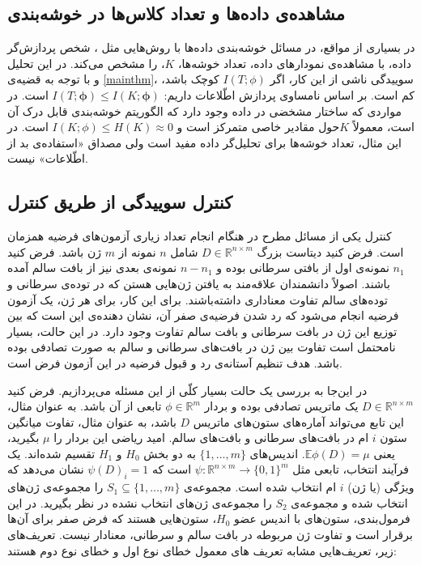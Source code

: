 \documentclass[a4paper,12pt]{article}
\newcommand{\E}{\mathbb{E}}
\newcommand{\bfphi}{\bm {\phi}}
\begin{document}
	\subsection{مشاهده‌ی داده‌‌ها و تعداد کلاس‌ها در خوشه‌بندی}
	در بسیاری از مواقع، در مسائل خوشه‌بندی داده‌ها با روش‌هایی مثل 
	،
	شخص پردازش‌گر داده، با مشاهد‌ه‌ی نمودارهای داده، تعداد خوشه‌ها،
	$K$،
	را مشخص می‌کند. در این تحلیل و با توجه به قضیه‌ی
	\eqref{mainthm}،
	سوییدگی ناشی از این کار، اگر 
	$I(T; \phi)$
	کوچک باشد، کم است. بر اساس نامساوی پردازش اطّلاعات داریم:
	$I(T; \bfphi) \leq I(K; \bfphi)$
	است. در مواردی که ساختار مشخضی در داده وجود دارد که الگوریتم خوشه‌بندی قابل درک آن است، معمولاً $K$حول مقادیر خاصی متمرکز است و 
	$I(K; \phi) \leq H(K) \approx 0$
	است. در این مثال، تعداد خوشه‌ها برای تحلیل‌گر داده مفید است ولی مصداق «استفاده‌ی بد از اطّلاعات» نیست.
	\subsection{کنترل سوییدگی از طریق کنترل
	}
	
	کنترل
	یکی از مسائل مطرح در هنگام انجام تعداد زیاری آزمون‌های فرضیه همزمان است. فرض کنید دیتاست بزرگ 
	$D \in \mathbb{R}^{n\times m}$
	شامل
	$n$
	نمونه از 
	$m$
	ژن باشد. فرض کنید 
	$n_1$
	نمونه‌ی اول از بافتی سرطانی بوده و 
	$n-n_1$
	نمونه‌ی بعدی نیز از بافت سالم آمده باشند. اصولاً دانشمندان علاقه‌مند به یافتن ژن‌هایی هستن که در توده‌ی سرطانی و توده‌های سالم تفاوت معناداری داشته‌باشند. برای این کار، برای هر ژن، یک آزمون فرضیه انجام می‌شود که رد شدن فرضیه‌ی صفر آن، نشان دهنده‌ی این است که بین توزیع این ژن در بافت سرطانی و بافت سالم تفاوت وجود دارد. در این حالت، بسیار نامحتمل است  تفاوت بین ژن در بافت‌های سرطانی و سالم به صورت تصادفی بوده باشد. هدف تنظیم آستانه‌ی رد و قبول فرضیه در این آزمون فرض است.
	
	در این‌جا به بررسی یک حالت بسیار کلّی از این مسئله می‌پردازیم. فرض کنید 
	$D \in \mathbb{R}^{n\times m}$
	یک ماتریس تصادفی بوده و بردار 
	$\phi \in \mathbb{R}^m$
	تابعی از آن باشد. به عنوان مثال، این تابع می‌تواند آماره‌های ستون‌های ماتریس 
	$D$
	باشد، به عنوان مثال، تفاوت میانگین ستون‌ 
	$i$
	ام در بافت‌های سرطانی و بافت‌های سالم.  امید ریاضی این بردار را 
	$\mu$
	بگیرید، یعنی
	$\E \phi(D) = \mu$.
	اندیس‌های 
	$\{1, \dots, m\}$
	به دو بخش 
	$H_0$
	و 
	$H_1$
	تقسیم شده‌اند. یک فرآیند انتخاب، تابعی مثل 
	$\psi: \mathbb{R}^{n\times m} \to \{0, 1\}^m$
	است که 
	$\psi(D)_i  =1$
	نشان می‌دهد که ویژگی (یا ژن) $i$ ام انتخاب شده است. مجموعه‌ی 
	$S_1 \subseteq \{1, \dots, m\}$
	را مجموعه‌ی ژن‌های انتخاب شده و مجموعه‌ی 
	$S_2$
	را مجموعه‌ی ژن‌های انتخاب نشده در نظر بگیرید.  در این فرمول‌بندی، ستون‌های با اندیس عضو
	$H_0$،
	ستون‌هایی هستند که فرض صفر برای آن‌ها برقرار است و تفاوت ژن مربوطه در بافت سالم و سرطانی، معنادار نیست. تعریف‌های زیر، تعریف‌هایی مشابه تعریف های معمول خطای نوع اول و خطای نوع دوم هستند:
	
\end{document}
